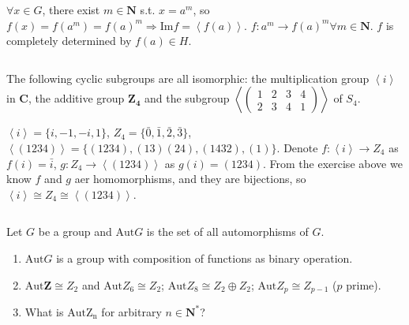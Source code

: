\begin{answer}
    $\forall x\in G$, there exist $m\in \mathbf{N}$ s.t. $x=a^{m}$, so $f(x)=f(a^{m})=f(a)^{m} \Rightarrow \mathrm{Im} f=\left\langle f(a)\right\rangle$. $f:a^{m}\to f(a)^{m} \forall m\in\mathbf{N}$. $f$ is completely determined by $f(a)\in H$.
\end{answer}

$$ $$

\begin{ex}
    The following cyclic subgroups are all isomorphic: the multiplication group $\left\langle i \right\rangle$ in $\mathbf{C}$, the additive group $\mathbf{Z_4}$ and the subgroup $\left\langle \begin{pmatrix}
        1 & 2 & 3 & 4\\
        2 & 3 & 4 & 1
    \end{pmatrix}\right\rangle$ of $S_4$.
\end{ex}

\begin{answer}
    $\left\langle i\right\rangle=\{i,-1,-i,1\}$, $Z_4=\{\bar{0},\bar{1},\bar{2},\bar{3}\}$,\\ $\left\langle(1234)\right\rangle=\{(1234),(13)(24),(1432),(1)\}$.
    Denote $f: \left\langle i\right\rangle\to Z_4$ as $f(i)=\bar{i}$, $g: Z_4\to \left\langle(1234)\right\rangle$ as $g(i)=(1234)$. From the exercise above we know $f$ and $g$ aer homomorphisms, and they are bijections, so $\left\langle i\right\rangle\cong Z_4\cong\left\langle(1234)\right\rangle$.
\end{answer}

$$ $$

\begin{ex}
    Let $G$ be a group and $\mathrm{Aut} G$ is the set of all automorphisms of $G$.
    \begin{enumerate}
        \item $\mathrm{Aut} G$ is a group with composition of functions as binary operation.
        \item $\mathrm{Aut} \mathbf{Z}\cong Z_2$ and $\mathrm{Aut} Z_6 \cong Z_2$; $\mathrm{Aut} Z_8\cong Z_2\oplus Z_2$; $\mathrm{Aut} Z_p\cong Z_{p-1}$ ($p$ prime).
        \item What is $\mathrm{Aut Z_n}$ for arbitrary $n\in \mathbf{N^*}$?
    \end{enumerate}
\end{ex}

